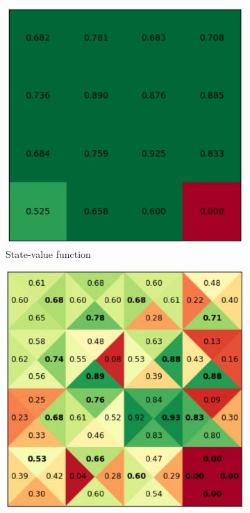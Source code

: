 \documentclass{article}
\begin{document}
\begin{enumerate}
\begin{figure}[H]
\begin{subfigure}[b]{0.5\linewidth}
		\includegraphics[width = \linewidth]{SarsaV2.jpg}
		\caption{State-value function}
	\end{subfigure}
	\begin{subfigure}[b]{0.5\linewidth}
		\includegraphics[width = \linewidth]{SarsaQ2.jpg}

\end{subfigure}
\end{figure}
\end{enumerate}
\end{document}
